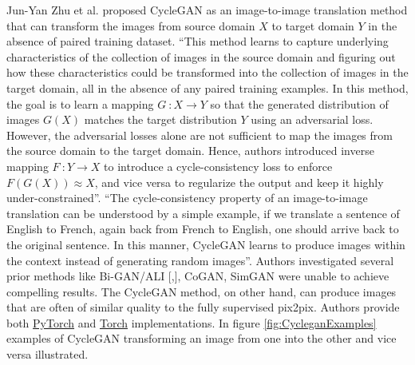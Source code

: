 Jun-Yan Zhu et al.\cite{zhu2020unpaired} proposed \ac{CycleGAN} as an image-to-image translation method that can transform the images from source domain $X$ to target domain $Y$ in the absence of paired training dataset. ``This method learns to capture underlying characteristics of the collection of images in the source domain and figuring out how these characteristics could be transformed into the collection of images in the target domain, all in the absence of any paired training examples. In this method, the goal is to learn a mapping $G\ \colon X \rightarrow Y$ so that the generated distribution of images $G(X)$ matches the target distribution $Y$ using an adversarial loss. However, the adversarial losses alone are not sufficient to map the images from the source domain to the target domain. Hence, authors introduced inverse mapping $F\ \colon Y \rightarrow X$ to introduce a cycle-consistency loss to enforce $F(G(X))\approx X$, and vice versa to regularize the output and keep it highly under-constrained''\cite{zhu2020unpaired}. ``The cycle-consistency property of an image-to-image translation can be understood by a simple example, if we translate a sentence of English to French, again back from French to English, one should arrive back to the original sentence. In this manner, \ac{CycleGAN} learns to produce images within the context instead of generating random images''\footnotemark. Authors investigated several prior methods like Bi-GAN/ALI [\cite{donahue2017adversarial},\cite{dumoulin2017adversarially}], CoGAN\cite{liu2016coupled}, SimGAN\cite{shrivastava2017learning} were unable to achieve compelling results. The \ac{CycleGAN} method, on other hand, can produce images that are often of similar quality to the fully supervised pix2pix\cite{isola2018imagetoimage}. Authors provide both \href{https://github.com/junyanz/pytorch-CycleGAN-and-pix2pix}{PyTorch} and \href{https://github.com/junyanz/CycleGAN}{Torch} implementations. In figure \ref{fig:CycleganExamples} examples of \ac{CycleGAN} transforming an image from one into the other and vice versa illustrated.




